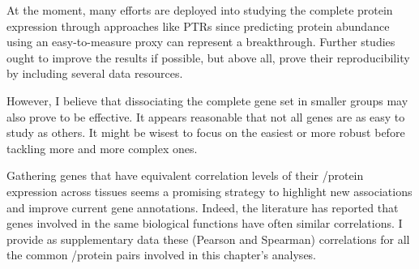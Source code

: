 At the moment, many efforts are deployed
into studying the complete protein expression through approaches like \glspl{PTR}
since predicting protein abundance using
an easy-to-measure proxy can represent a breakthrough.
Further studies ought to improve the results if possible,
but above all,
prove their reproducibility by including several data resources.

However, I believe that dissociating the complete gene set in smaller groups
may also prove to be effective.
It appears reasonable that not all genes are as easy to study as others.
It might be wisest to focus on the easiest or more robust
before tackling more and more complex ones.

Gathering genes that have equivalent correlation levels of
their \mRNA/protein expression across tissues
seems a promising strategy to highlight new associations and
improve current gene annotations.
Indeed, the literature has reported that
genes involved in the same biological functions have often similar correlations.
I provide as supplementary data these (Pearson and Spearman) correlations
for all the common \mRNA/protein pairs involved in this chapter's analyses.



